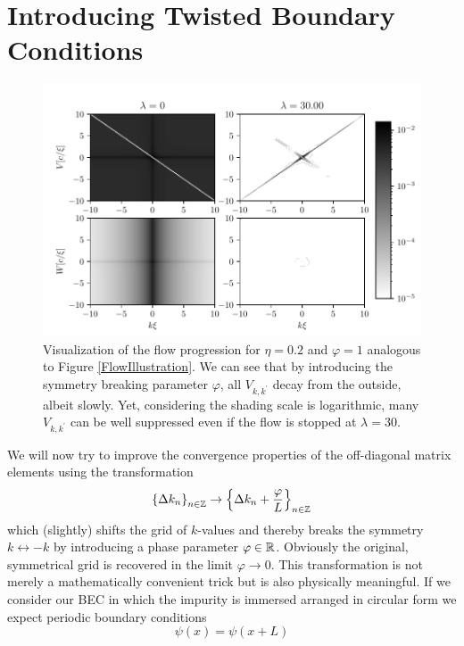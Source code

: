 \section{Introducing Twisted Boundary Conditions}
\begin{figure}[H]
    \centering
    \includegraphics[width=\textwidth]{figures/plots/PDF/FlowIllustrationPhi.pdf}
    \caption[Flow Visualization for $\eta=0.2$ and $\varphi = 1$]{Visualization of the flow progression for $\eta=0.2$ and $\varphi = 1$ analogous to Figure \ref{FlowIllustration}. We can see that by introducing the symmetry breaking parameter $\varphi$, all $V_{k,k^\prime}$ decay from the outside, albeit slowly. Yet, considering the shading scale is logarithmic, many $V_{k,k^\prime}$ can be well suppressed even if the flow is stopped at $\lambda=30$.}
    \label{FlowIllustrationPhi}
\end{figure}
We will now try to improve the convergence properties of the off-diagonal matrix elements using the transformation
\begin{equation} \label{twisted_trafo}
\left\{\Delta k_n\right\}_{n\in\mathbb{Z}}\rightarrow \left\{\Delta k_n+\frac{\varphi}{L}\right\}_{n\in\mathbb{Z}}
\end{equation}
 which (slightly) shifts the grid of $k$-values and thereby breaks the symmetry $k\leftrightarrow -k$ by introducing a phase parameter $\varphi\in\mathbb{R}$. Obviously the original, symmetrical grid is recovered in the limit $\varphi\rightarrow 0$. 
This transformation is not merely a mathematically convenient trick but is also physically meaningful. If we consider our BEC in which the impurity is immersed arranged in circular form we expect periodic boundary conditions
\begin{equation}
\psi(x)=\psi(x+L)
\end{equation}
